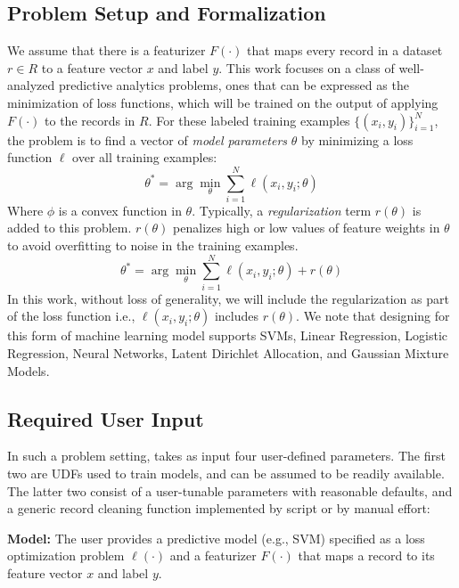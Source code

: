 \subsection{Problem Setup and Formalization}
We assume that there is a featurizer $F(\cdot)$ that maps every record in a dataset $r \in R$ to a feature vector $x$ and label $y$.
This work focuses on a class of well-analyzed predictive analytics problems, ones that can be expressed as the minimization of loss functions, which will be trained on the output of applying $F(\cdot)$ to the records in $R$.
For these labeled training examples $\{(x_{i},y_{i})\}_{i=1}^{N}$, the problem is to find a vector of \emph{model parameters} $\theta$ by minimizing a loss function $\ell$ over all training examples:
\[
 \theta^{*}=\arg\min_{\theta}\sum_{i=1}^{N}\ell(x_{i},y_{i};\theta)
\]
Where $\phi$ is a convex function in $\theta$.
Typically, a \emph{regularization} term $r(\theta)$ is added to this problem.
$r(\theta)$ penalizes high or low values of feature weights in $\theta$ to avoid overfitting to noise in the training examples.
\begin{equation}
 \theta^{*}=\arg\min_{\theta}\sum_{i=1}^{N}\ell(x_{i},y_{i};\theta) + r(\theta)
 \label{ideal}
\end{equation}
In this work, without loss of generality, we will include the regularization as part of the loss function i.e., $\ell(x_{i},y_{i};\theta)$ includes $r(\theta)$.
We note that designing \sys for this form of machine learning model supports SVMs, Linear Regression, Logistic Regression, Neural Networks, Latent Dirichlet Allocation, and Gaussian Mixture Models.

\subsection{Required User Input}\label{uinp}
In such a problem setting, \sys takes as input four user-defined parameters.  The first two are UDFs used to train models, and can be assumed to be readily available.  
The latter two consist of a user-tunable parameters with reasonable defaults,
and a generic record cleaning function implemented by script or by manual effort:

\noindent\textbf{Model:} The user provides a predictive model (e.g., SVM) specified as a loss optimization problem $\ell(\cdot)$ and a featurizer $F(\cdot)$ that maps a record to its feature vector $x$ and label $y$.

\vspace{0.25em}

